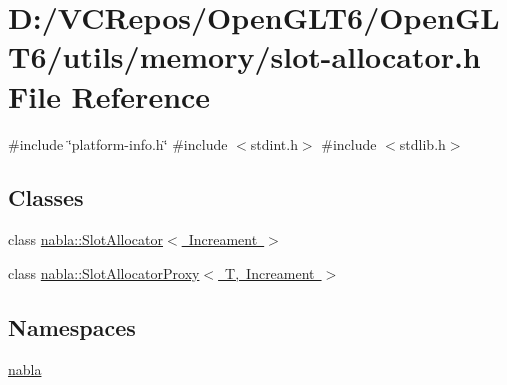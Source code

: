 \hypertarget{slot-allocator_8h}{}\section{D\+:/\+V\+C\+Repos/\+Open\+G\+L\+T6/\+Open\+G\+L\+T6/utils/memory/slot-\/allocator.h File Reference}
\label{slot-allocator_8h}
{\ttfamily \#include \char`\"{}platform-\/info.\+h\char`\"{}}\newline
{\ttfamily \#include $<$stdint.\+h$>$}\newline
{\ttfamily \#include $<$stdlib.\+h$>$}\newline
\subsection*{Classes}
\begin{DoxyCompactItemize}
\item 
class \mbox{\hyperlink{classnabla_1_1_slot_allocator}{nabla\+::\+Slot\+Allocator$<$ Increament $>$}}
\item 
class \mbox{\hyperlink{classnabla_1_1_slot_allocator_proxy}{nabla\+::\+Slot\+Allocator\+Proxy$<$ T, Increament $>$}}
\end{DoxyCompactItemize}
\subsection*{Namespaces}
\begin{DoxyCompactItemize}
\item 
 \mbox{\hyperlink{namespacenabla}{nabla}}
\end{DoxyCompactItemize}
